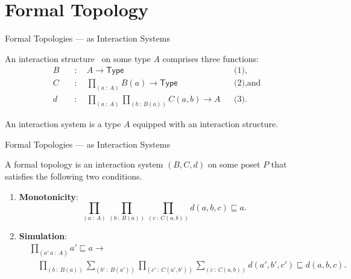 \documentclass[xcolor={dvipsnames}]{beamer}
\newcommand{\pity}[3]{\prod_{(#1~:~#2)} #3}
\newcommand{\sigmaty}[3]{\sum_{(#1~:~#2)} #3}
\newcommand{\univ}{\mathsf{Type}}
\begin{document}
\section{Formal Topology}

\begin{frame}{Formal Topologies --- as Interaction Systems}
  \large

  An \alert{interaction structure}~\cite{tree-sets} on some type $A$ comprises three
  functions:
  \begin{align*}
    B  &\quad:\quad A \rightarrow \univ{}                               && \text{(1)},           \\
    C  &\quad:\quad \pity{a}{A}{B(a) \rightarrow \univ{}}               && \text{(2)}, \text{and}\\
    d  &\quad:\quad \pity{a}{A}{\pity{b}{B(a)}{C(a, b) \rightarrow A}}  && \text{(3)}.
  \end{align*}

  An \alert{interaction system} is a type $A$ equipped with an interaction structure.
\end{frame}

\begin{frame}{Formal Topologies --- as Interaction Systems}
  \large

  A \alert{formal topology} is an interaction system $(B, C, d)$ on some poset $P$ that
  satisfies the following two conditions.

  \begin{enumerate}
    \item \textbf{Monotonicity}:
      {\normalsize
      \begin{equation*}
        \pity{a}{A}{\pity{b}{B(a)}{\pity{c}{C(a, b)}{d(a, b, c) \sqsubseteq a}}}.
      \end{equation*}
      }
    \item \textbf{Simulation}:
      {\normalsize
      \begin{align*}
        &\pity{a'~a}{A}{
          a' \sqsubseteq a \rightarrow\\
            &\quad\pity{b}{B(a)}{%
              \sigmaty{b'}{B(a')}{
                \pity{c'}{C(a', b')}{
                  \sigmaty{c}{C(a, b)}{d(a', b', c') \sqsubseteq d(a, b, c)}
                }
              }
            }
        }.
      \end{align*}
      }
  \end{enumerate}
\end{frame}
\end{document}
